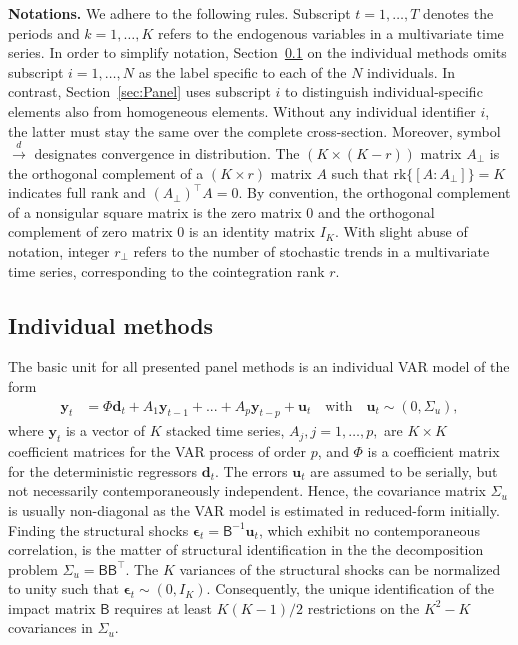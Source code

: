 \textbf{Notations.} We adhere to the following rules. Subscript $ t = 1, \ldots, T $ denotes the periods and $ k = 1, \ldots, K $ refers to the endogenous variables in a multivariate time series. In order to simplify notation, Section~\ref{sec:Indiv} on the individual methods omits subscript $ i = 1, \ldots, N $ as the label specific to each of the $ N $ individuals. In contrast, Section~\ref{sec:Panel} uses subscript $ i $ to distinguish individual-specific elements also from homogeneous elements. Without any individual identifier $ i $, the latter must stay the same over the complete cross-section. Moreover, symbol $ \overset{d}{\longrightarrow} $ designates convergence in distribution. The $ (K \times (K-r)) $ matrix $ A_\perp $ is the orthogonal complement of a $ (K \times r) $ matrix $ A $ such that $ \text{rk} \lbrace [A : A_\perp] \rbrace = K $ indicates full rank and $ \left( A_\perp \right)^\top A=0 $. By convention, the orthogonal complement of a nonsigular square matrix is the zero matrix $ 0 $ and the orthogonal complement of zero matrix $ 0 $ is an identity matrix $ I_K $. With slight abuse of notation, integer $ r_\perp $ refers to the number of stochastic trends in a multivariate time series, corresponding to the cointegration rank $ r $.


\subsection{Individual methods} \label{sec:Indiv}
The basic unit for all presented panel methods is an individual VAR model of the form 
\begin{align} \label{eq:VAR}
	\boldsymbol{y}_{t} &= \Phi \boldsymbol{d}_{t} + A_1 \boldsymbol{y}_{t-1} + ... + A_p \boldsymbol{y}_{t-p} + \boldsymbol{u}_{t} \quad \textrm{with} \quad \boldsymbol{u}_{t} \sim (0,\Sigma_u) ,
\end{align}
where $\boldsymbol{y}_{t}$ is a vector of $ K $ stacked time series, $A_j, j=1,\ldots,p,$ are $ K \times K $ coefficient matrices for the VAR process of order $p$, and $ \Phi $ is a coefficient matrix for the deterministic regressors $ \boldsymbol{d}_{t} $. The errors $ \boldsymbol{u}_{t} $ are assumed to be serially, but not necessarily contemporaneously independent. Hence, the covariance matrix $ \Sigma_u $ is usually non-diagonal as the VAR model is estimated in reduced-form initially. Finding the structural shocks $ \boldsymbol{\epsilon}_{t} = \mathsf{B}^{-1} \boldsymbol{u}_{t} $, which exhibit no contemporaneous correlation, is the matter of structural identification in the the decomposition problem $ \Sigma_u = \mathsf{B} \mathsf{B}^\top $. The $ K $ variances of the structural shocks can be normalized to unity such that $ \boldsymbol{\epsilon}_{t} \sim ( 0, I_K ) $. Consequently, the unique identification of the impact matrix $ \mathsf{B}$ requires at least $ K(K-1)/2 $ restrictions on the $ K^2-K $ covariances in $ \Sigma_u $.

